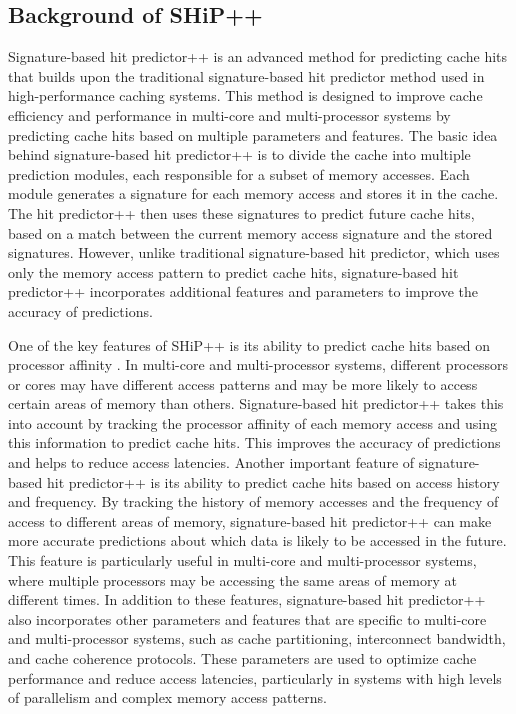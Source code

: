 \subsection{Background of SHiP++}
Signature-based hit predictor++ is an advanced method for predicting cache hits that builds upon the traditional signature-based hit predictor method used in high-performance caching systems.\cite{San,arka} This method is designed to improve cache efficiency and performance in multi-core and multi-processor systems by predicting cache hits based on multiple parameters and features.\cite{Samira} The basic idea behind signature-based hit predictor++ is to divide the cache into multiple prediction modules, each responsible for a subset of memory accesses.\cite{ADueling} Each module generates a signature for each memory access and stores it in the cache. The hit predictor++ then uses these signatures to predict future cache hits, based on a match between the current memory access signature and the stored signatures. However, unlike traditional signature-based hit predictor, which uses only the memory access pattern to predict cache hits, signature-based hit predictor++ incorporates additional features and parameters to improve the accuracy of predictions\cite{Belady}.\par

One of the key features of SHiP++ is its ability to predict cache hits based on processor affinity \cite{Evan}. In multi-core and multi-processor systems, different processors or cores may have different access patterns and may be more likely to access certain areas of memory than others. Signature-based hit predictor++ takes this into account by tracking the processor affinity of each memory access and using this information to predict cache hits. This improves the accuracy of predictions and helps to reduce access latencies. Another important feature of signature-based hit predictor++ is its ability to predict cache hits based on access history and frequency. By tracking the history of memory accesses and the frequency of access to different areas of memory, signature-based hit predictor++ can make more accurate predictions about which data is likely to be accessed in the future. This feature is particularly useful in multi-core and multi-processor systems, where multiple processors may be accessing the same areas of memory at different times. In addition to these features, signature-based hit predictor++ also incorporates other parameters and features that are specific to multi-core and multi-processor systems, such as cache partitioning, interconnect bandwidth, and cache coherence protocols. These parameters are used to optimize cache performance and reduce access latencies, particularly in systems with high levels of parallelism and complex memory access patterns.\par

